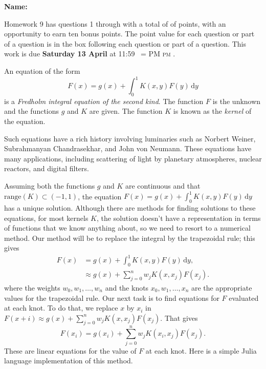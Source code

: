 \documentclass[12pt,fleqn]{exam}
\makeatletter
\newcommand{\range}{\mathrm{range}}
\newcommand{\quiz}{9}
\newcommand{\term}{Spring}
\DeclareRobustCommand{\maybefakesc}[1]{%
  \ifnum\pdfstrcmp{\f@series}{\bfdefault}=\z@
    {\fontsize{\dimexpr0.8\dimexpr\f@size pt\relax}{0}\selectfont\uppercase{#1}}%
  \else
    \textsc{#1}%
  \fi
}
\newcommand\PM{\,\maybefakesc{pm}\xspace}
\makeatother
\begin{document}
\vspace{0.1in}
\noindent{}
{\bf Name:}  \\
\noindent \makebox[3.0truein][l]{\textbf{Homework \quiz, \term \/ \the\year}}
\vspace{0.1in}




\noindent  Homework 9  has questions 1 through  \numquestions \/ with a total of of  \numpoints\/  points,  with 
an opportunity to earn ten bonus points. The point
value for each question or part of a question is in the box following each question or part of a question.
This work is due \textbf{Saturday 13 April  } at 11:59 \PM.  

An equation of the form
\begin{equation*}
   F(x) = g(x) + \int_0^1 K(x,y) F(y) \, \mathrm{d} y
\end{equation*}
is a \emph{Fredholm  integral equation of the second kind}.  The function $F$ is the unknown and the functions $g$ and $K$ are given.  The function
$K$ is known as the \emph{kernel} of the equation.  

Such equations have a rich history involving luminaries such as Norbert Weiner, Subrahmanyan Chandrasekhar, and John von Neumann. These equations have many applications, including scattering of light by planetary atmospheres, nuclear reactors, and digital filters. 

Assuming both the functions $g$ and $K$ are continuous and that $\range(K) \subset (-1,1)$, the equation  $F(x) = g(x) + \int_0^1 K(x,y) F(y) \, \mathrm{d} y$ has a unique solution.  Although there are methods for finding solutions to these equations, for most kernels $K$, the solution doesn't have a representation in terms of functions that we know anything about, so we need to resort to a numerical method.  Our method will be to 
replace the integral by the trapezoidal rule; this gives
\begin{align*}
     F(x) &= g(x) + \int_0^1 K(x,y) F(y) \, \mathrm{d} y, \\
             &\approx g(x) + \sum_{j=0}^n w_j K(x,x_j) F(x_j).
\end{align*}
where the weights $w_0, w_1, \dots, w_n$ and the knots $x_0, w_1, \dots, x_n$ are the appropriate values for the trapezoidal rule.
Our next task is to find equations for $F$ evaluated at each knot. To do that, we replace $x$ by $x_i$ in $F(x+i) \approx g(x) + \sum_{j=0}^n w_j K(x,x_j) F(x_j)$. That gives
\begin{equation*}
      F(x_i) = g(x_i) + \sum_{j=0}^n w_j K(x_i,x_j) F(x_j).
\end{equation*}
These are linear equations for the value of $F$ at each knot.  Here is a simple Julia language implementation of this method. 
\end{document}
